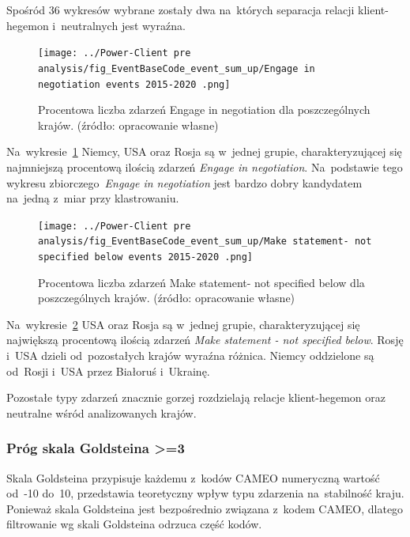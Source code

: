\documentclass[11pt]{report}
\begin{document}
    Spośród 36 wykresów wybrane zostały dwa na~których separacja relacji klient-hegemon i~neutralnych jest wyraźna.

    \begin{figure}[tp]
        \centering
        \texttt{[image: ../Power-Client pre analysis/fig\_EventBaseCode\_event\_sum\_up/Engage in negotiation events 2015-2020 .png]}
        \caption{Procentowa liczba zdarzeń Engage in negotiation dla poszczególnych krajów. (źródło: opracowanie własne)}
        \label{fig:Power-Client:ERC:SumUp:Engage in negotiation}
    \end{figure}

    Na~wykresie~\ref{fig:Power-Client:ERC:SumUp:Engage in negotiation} Niemcy, USA oraz Rosja są w~jednej grupie,
    charakteryzującej się najmniejszą procentową ilością zdarzeń \textit{Engage in negotiation}.
    Na~podstawie tego wykresu zbiorczego~\textit{Engage in negotiation}
    jest bardzo dobry kandydatem na~jedną z~miar przy klastrowaniu.

    \begin{figure}[tp]
        \centering
        \texttt{[image: ../Power-Client pre analysis/fig\_EventBaseCode\_event\_sum\_up/Make statement- not specified below events 2015-2020 .png]}
        \caption{Procentowa liczba zdarzeń Make statement- not specified below dla poszczególnych krajów. (źródło: opracowanie własne)}
        \label{fig:Power-Client:ERC:SumUp:Make statement - not specified below}
    \end{figure}

    Na~wykresie~\ref{fig:Power-Client:ERC:SumUp:Make statement - not specified below} USA oraz Rosja są w~jednej grupie,
    charakteryzującej się największą procentową ilością zdarzeń \textit{Make statement - not specified below}.
    Rosję i~USA dzieli od~pozostałych krajów wyraźna różnica.
    Niemcy oddzielone są od~Rosji i~USA przez Białoruś i~Ukrainę.

    Pozostałe typy zdarzeń znacznie gorzej rozdzielają relacje klient-hegemon oraz neutralne wśród analizowanych krajów.

    \subsubsection{Próg skala Goldsteina >=3}
    Skala Goldsteina przypisuje każdemu z~kodów CAMEO numeryczną wartość od~-10 do~10, przedstawia teoretyczny wpływ typu zdarzenia na~stabilność kraju.
    Ponieważ skala Goldsteina jest bezpośrednio związana z~kodem CAMEO, dlatego filtrowanie wg skali Goldsteina odrzuca część kodów.
\end{document}
